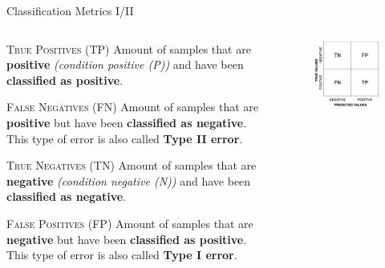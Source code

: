 \documentclass[main.tex]{subfiles}
\begin{document}
    \begin{frame}{Classification Metrics I/II}
        \begin{columns}
            \begin{column}{0.6\textwidth}
                \begin{alertblock}{\textsc{True Positives (TP)}}
                    Amount of samples that are \textbf{positive} \textit{(condition positive (P))} and have been \textbf{classified as positive}.
                \end{alertblock}
                \begin{alertblock}{\textsc{False Negatives (FN)}}
                    Amount of samples that are \textbf{positive} but have been \textbf{classified as negative}. This type of error is also called \textbf{Type II error}.
                \end{alertblock}
                \begin{alertblock}{\textsc{True Negatives (TN)}}
                    Amount of samples that are \textbf{negative} \textit{(condition negative (N))} and have been \textbf{classified as negative}.
                \end{alertblock}
                \begin{alertblock}{\textsc{False Positives (FP)}}
                    Amount of samples that are \textbf{negative} but have been \textbf{classified as positive}. This type of error is also called \textbf{Type I error}.
                \end{alertblock}
            \end{column}
            \begin{column}{0.4\textwidth}
                \begin{figure}
                    \label{fig:confusion-matrix}
                    \includegraphics[height=0.8\textwidth, keepaspectratio]{figures/drawio/confusion-matrix.png}
                \end{figure}
            \end{column}
        \end{columns}
    \end{frame}
\end{document}

